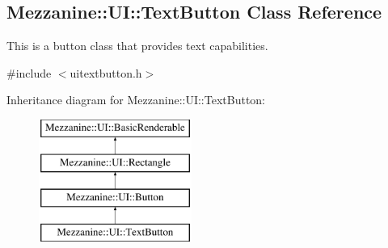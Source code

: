 \hypertarget{classMezzanine_1_1UI_1_1TextButton}{
\subsection{Mezzanine::UI::TextButton Class Reference}
\label{classMezzanine_1_1UI_1_1TextButton}
}


This is a button class that provides text capabilities.  




{\ttfamily \#include $<$uitextbutton.h$>$}

Inheritance diagram for Mezzanine::UI::TextButton:\begin{figure}[H]
\begin{center}
\leavevmode
\includegraphics[height=4.000000cm]{classMezzanine_1_1UI_1_1TextButton}
\end{center}
\end{figure}
